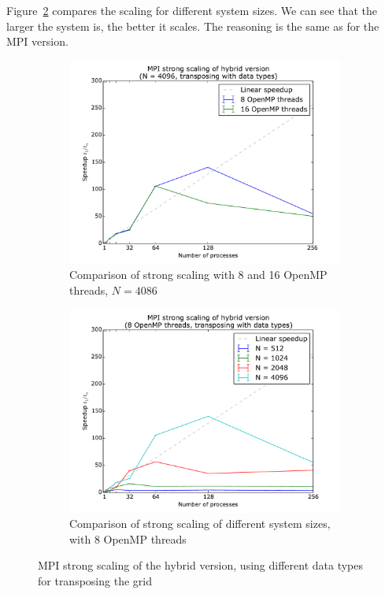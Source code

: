 \documentclass[a4paper]{article}
\begin{document}
Figure~\ref{fig:hybrid-strong-scaling-mpi-data-sizes} compares the scaling for different system sizes. We can see that the larger the system is, the better it scales.
The reasoning is the same as for the MPI version.
\begin{figure}
	\centering
	\begin{subfigure}{0.45\textwidth}
		\includegraphics[width=\textwidth]{hybrid_strong_scaling_mpi_4096.pdf}
		\caption{Comparison of strong scaling with 8 and 16 OpenMP threads, $N=4086$}
		\label{fig:hybrid-strong-scaling-mpi-data-threads}
	\end{subfigure}
	\quad
	\begin{subfigure}{0.45\textwidth}
		\includegraphics[width=\textwidth]{hybrid_strong_scaling_mpi_sizes.pdf}
		\caption{Comparison of strong scaling of different system sizes, with 8 OpenMP threads}
		\label{fig:hybrid-strong-scaling-mpi-data-sizes}
	\end{subfigure}
	\caption{MPI strong scaling of the hybrid version, using different data types for transposing the grid}
	\label{fig:hybrid-strong-scaling-mpi-data}
\end{figure}
\end{document}
